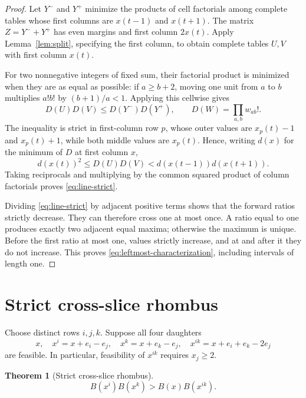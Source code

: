 \documentclass[10pt]{article}
\newtheorem{theorem}{Theorem}
\begin{document}
\begin{proof}
Let \(Y^-\) and \(Y^+\) minimize the products of cell factorials among
complete tables whose first columns are \(x(t-1)\) and \(x(t+1)\).
The matrix \(Z=Y^-+Y^+\) has even margins and first column \(2x(t)\).
Apply Lemma~\ref{lem:split}, specifying the first column, to obtain
complete tables \(U,V\) with first column \(x(t)\).

For two nonnegative integers of fixed sum, their factorial product is
minimized when they are as equal as possible: if \(a\ge b+2\), moving
one unit from \(a\) to \(b\) multiplies \(a!b!\) by
\((b+1)/a<1\).  Applying this cellwise gives
\[
 D(U)D(V)\le D(Y^-)D(Y^+),
 \qquad D(W)=\prod_{a,b}w_{ab}!.
\]
The inequality is strict in first-column row \(p\), whose outer values
are \(x_p(t)-1\) and \(x_p(t)+1\), while both middle values are
\(x_p(t)\).  Hence, writing \(d(x)\) for the minimum of \(D\) at first
column \(x\),
\[
 d(x(t))^2\le D(U)D(V)
 <d(x(t-1))d(x(t+1)).
\]
Taking reciprocals and multiplying by the common squared product of
column factorials proves \eqref{eq:line-strict}.

Dividing \eqref{eq:line-strict} by adjacent positive terms shows that
the forward ratios strictly decrease.  They can therefore cross one
at most once.  A ratio equal to one produces exactly two adjacent equal
maxima; otherwise the maximum is unique.  Before the first ratio at
most one, values strictly increase, and at and after it they do not
increase.  This proves \eqref{eq:leftmost-characterization}, including
intervals of length one.
\end{proof}

\section{Strict cross-slice rhombus}

Choose distinct rows \(i,j,k\).  Suppose all four daughters
\[
 x,\quad x^i=x+e_i-e_j,\quad x^k=x+e_k-e_j,\quad
 x^{ik}=x+e_i+e_k-2e_j
\]
are feasible.  In particular, feasibility of \(x^{ik}\) requires
\(x_j\ge2\).

\begin{theorem}[Strict cross-slice rhombus]
\label{thm:rhombus}
\begin{equation}
 B(x^i)B(x^k)>B(x)B(x^{ik}).
 \label{eq:strict-rhombus}
\end{equation}
\end{theorem}
\end{document}
